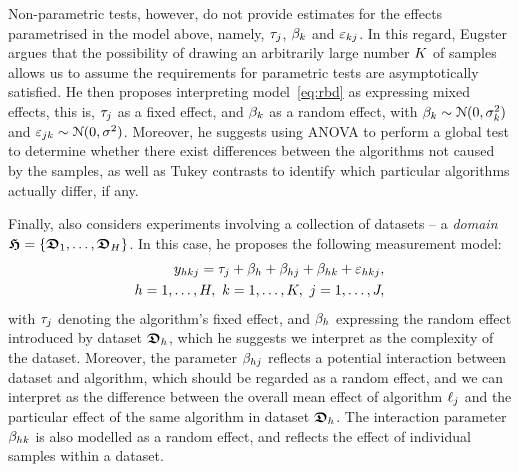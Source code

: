 Non-parametric tests, however, do not provide estimates for the effects
parametrised in the model above, namely, %
$\tau_{j}$, 
$\beta_{k}$ and 
$\varepsilon_{kj}$.
%
In this regard, Eugster argues that the possibility of drawing an
arbitrarily large number $K$ of samples allows us to assume the
requirements for parametric tests are asymptotically satisfied.
%
He then proposes interpreting model~\ref{eq:rbd} as expressing
mixed effects, this is,
$\tau_{j}$ as a fixed effect,
and $\beta_{k}$ as a random effect,
with $\beta_{k} \sim \mathcal{N}(0,\sigma^2_{k})$
and $\varepsilon_{jk} \sim \mathcal{N}(0, \sigma^2)$.
%
Moreover, he suggests using ANOVA to perform a global test to
determine whether there exist differences between the algorithms
not caused by the samples,
%
as well as Tukey contrasts to identify which particular algorithms
actually differ, if any.

Finally, \citet{EugsterPhD} also considers experiments involving a collection
of datasets -- a \emph{domain} 
$\boldsymbol{\mathfrak{H}} = \{\boldsymbol{\mathfrak{D}}_1,\dots, \boldsymbol{\mathfrak{D}}_H\}$.
%
In this case, he proposes the following measurement model:
%
\begin{align}
  \begin{split}
  \PerfFun_{\DatasetIx\SampIx\AlgIx} =
    \EffectTreat_{\AlgIx} + \EffectBlock_{\DatasetIx} +
    \EffectBlock_{\DatasetIx\AlgIx} + \EffectBlock_{\DatasetIx\SampIx} +
    \Residual_{\DatasetIx\SampIx\AlgIx},\\
  \DatasetIx = 1,\dots,\DatasetNum,~%
    \SampIx = 1,\dots,\SampNum,~%
    \AlgIx = 1,\dots,\AlgNum,
  \end{split}
  \label{eq:domain}
\end{align}
%
with $\tau_{j}$ denoting the algorithm's fixed effect, and
$\beta_{h}$ expressing the random effect introduced
by dataset $\boldsymbol{\mathfrak{D}}_{h}$, which he suggests we interpret
as the complexity of the dataset.
%
Moreover, the parameter $\beta_{hj}$ 
reflects a potential interaction between dataset and algorithm,
which should be regarded as a random effect, and
we can interpret as the difference between the overall
mean effect of algorithm $\ell_{j}$ and the particular effect of the 
same algorithm in dataset $\boldsymbol{\mathfrak{D}}_{h}$.
%
The interaction parameter $\beta_{hk}$ 
is also modelled as a random effect, and reflects the effect
of individual samples within a dataset.


